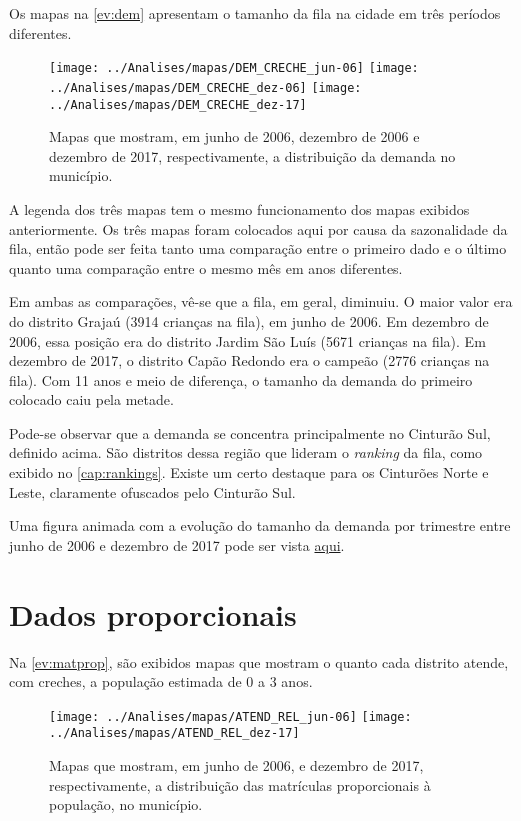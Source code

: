 Os mapas na \autoref{ev:dem} apresentam o tamanho da fila na cidade em três períodos diferentes.

\begin{figure}[H]
	\centering
	\texttt{[image: ../Analises/mapas/DEM\_CRECHE\_jun-06]}
	\texttt{[image: ../Analises/mapas/DEM\_CRECHE\_dez-06]}
	\texttt{[image: ../Analises/mapas/DEM\_CRECHE\_dez-17]}
	\caption{Mapas que mostram, em junho de 2006, dezembro de 2006 e dezembro de 2017, respectivamente, a distribuição da demanda no município.}
	\label{ev:dem}
\end{figure}

A legenda dos três mapas tem o mesmo funcionamento dos mapas exibidos anteriormente. Os três mapas foram colocados aqui por causa da sazonalidade da fila, então pode ser feita tanto uma comparação entre o primeiro dado e o último quanto uma comparação entre o mesmo mês em anos diferentes.

Em ambas as comparações, vê-se que a fila, em geral, diminuiu. O maior valor era do distrito Grajaú (3914 crianças na fila), em junho de 2006. Em dezembro de 2006, essa posição era do distrito Jardim São Luís (5671 crianças na fila). Em dezembro de 2017, o distrito Capão Redondo era o campeão (2776 crianças na fila). Com 11 anos e meio de diferença, o tamanho da demanda do primeiro colocado caiu pela metade.

Pode-se observar que a demanda se concentra principalmente no Cinturão Sul, definido acima. São distritos dessa região que lideram o \textit{ranking} da fila, como exibido no \autoref{cap:rankings}. Existe um certo destaque para os Cinturões Norte e Leste, claramente ofuscados pelo Cinturão Sul.

Uma figura animada com a evolução do tamanho da demanda por trimestre entre junho de 2006 e dezembro de 2017 pode ser vista \href{https://lsflp.github.io/MAC0213/multimidia/DEM_CRECHE.gif}{aqui}.

\section{Dados proporcionais}

Na \autoref{ev:matprop}, são exibidos mapas que mostram o quanto cada distrito atende, com creches, a população estimada de 0 a 3 anos.

\begin{figure}[H]
	\centering
	\texttt{[image: ../Analises/mapas/ATEND\_REL\_jun-06]}
	\texttt{[image: ../Analises/mapas/ATEND\_REL\_dez-17]}
	\caption{Mapas que mostram, em junho de 2006, e dezembro de 2017, respectivamente, a distribuição das matrículas proporcionais à população, no município.}
	\label{ev:matprop}
\end{figure}

